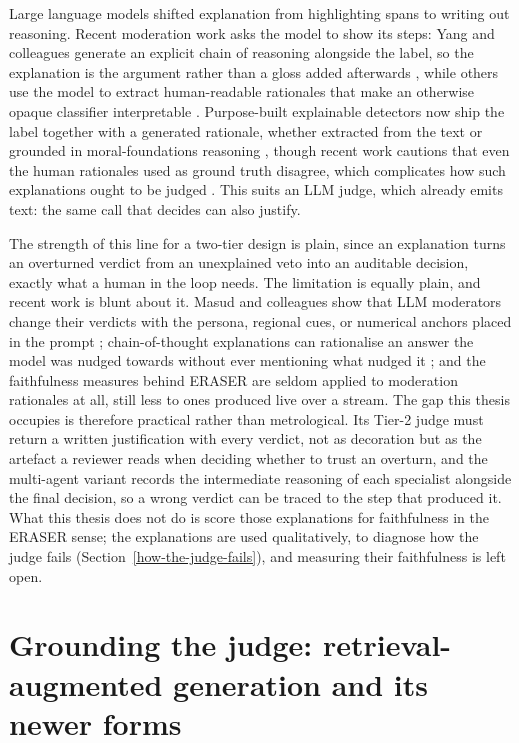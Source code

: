 Large language models shifted explanation from highlighting spans to writing out reasoning. Recent moderation work asks the model to show its steps: Yang and colleagues generate an explicit chain of reasoning alongside the label, so the explanation is the argument rather than a gloss added afterwards \citep{hare2023}, while others use the model to extract human-readable rationales that make an otherwise opaque classifier interpretable \citep{llmrationales2024}. Purpose-built explainable detectors now ship the label together with a generated rationale, whether extracted from the text \citep{targe2025} or grounded in moral-foundations reasoning \citep{smra2026}, though recent work cautions that even the human rationales used as ground truth disagree, which complicates how such explanations ought to be judged \citep{disagreerationales2026}. This suits an LLM judge, which already emits text: the same call that decides can also justify.

The strength of this line for a two-tier design is plain, since an explanation turns an overturned verdict from an unexplained veto into an auditable decision, exactly what a human in the loop needs. The limitation is equally plain, and recent work is blunt about it. Masud and colleagues show that LLM moderators change their verdicts with the persona, regional cues, or numerical anchors placed in the prompt \citep{hatepersonified2024}; chain-of-thought explanations can rationalise an answer the model was nudged towards without ever mentioning what nudged it \citep{turpin2023unfaithful}; and the faithfulness measures behind ERASER are seldom applied to moderation rationales at all, still less to ones produced live over a stream. The gap this thesis occupies is therefore practical rather than metrological. Its Tier-2 judge must return a written justification with every verdict, not as decoration but as the artefact a reviewer reads when deciding whether to trust an overturn, and the multi-agent variant records the intermediate reasoning of each specialist alongside the final decision, so a wrong verdict can be traced to the step that produced it. What this thesis does not do is score those explanations for faithfulness in the ERASER sense; the explanations are used qualitatively, to diagnose how the judge fails (Section~\ref{how-the-judge-fails}), and measuring their faithfulness is left open.

\section{Grounding the judge: retrieval-augmented generation and its newer forms}\label{retrieval-augmented-generation}

